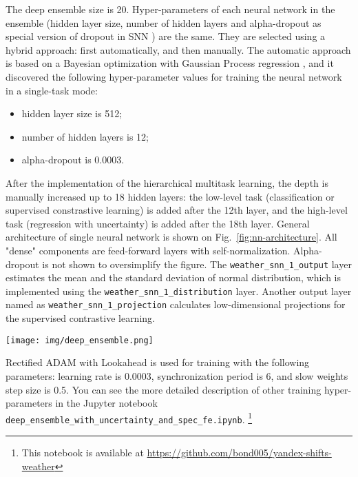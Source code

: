 \documentclass{article}
\begin{document}
The deep ensemble size is 20. Hyper-parameters of each neural network in the ensemble (hidden layer size, number of hidden layers and alpha-dropout as special version of dropout in SNN \cite{Klambauer2017}) are the same. They are selected using a hybrid approach: first automatically, and then manually. The automatic approach is based on a Bayesian optimization with Gaussian Process regression \cite{Frazier2018ATO}, and it discovered the following hyper-parameter values for training the neural network in a single-task mode:

\begin{itemize}
    \item hidden layer size is 512;
    \item number of hidden layers is 12;
    \item alpha-dropout is 0.0003.
\end{itemize}

After the implementation of the hierarchical multitask learning, the depth is manually increased up to 18 hidden layers: the low-level task (classification or supervised constrastive learning) is added after the 12th layer, and the high-level task (regression with uncertainty) is added after the 18th layer. General architecture of single neural network is shown on Fig.~\ref{fig:nn-architecture}. All "dense" components are feed-forward layers with self-normalization. Alpha-dropout is not shown to oversimplify the figure. The \texttt{weather\_snn\_1\_output} layer estimates the mean and the standard deviation of normal distribution, which is implemented using the \texttt{weather\_snn\_1\_distribution} layer. Another output layer named as \texttt{weather\_snn\_1\_projection} calculates low-dimensional projections for the supervised contrastive learning.

\begin{figure*}[hbt!]
 \centering
\begin{minipage}[h]{0.9\linewidth}
  \centering
  \centerline{\texttt{[image: img/deep\_ensemble.png]}}
  \vspace{-0.1cm}
\end{minipage}
 \caption{Architecture of the deep neural network with hierarchical multitask learning.}
 \label{fig:nn-architecture}
\end{figure*}

Rectified ADAM \cite{Liu2020OnTV} with Lookahead \cite{Zhang2019LookaheadOK} is used for training with the following parameters: learning rate is 0.0003, synchronization period is 6, and slow weights step size is 0.5. You can see the more detailed description of other training hyper-parameters in the Jupyter notebook \texttt{deep\_ensemble\_with\_uncertainty\_and\_spec\_fe.ipynb}. \footnote{This notebook is available at \url{https://github.com/bond005/yandex-shifts-weather}}
\end{document}
